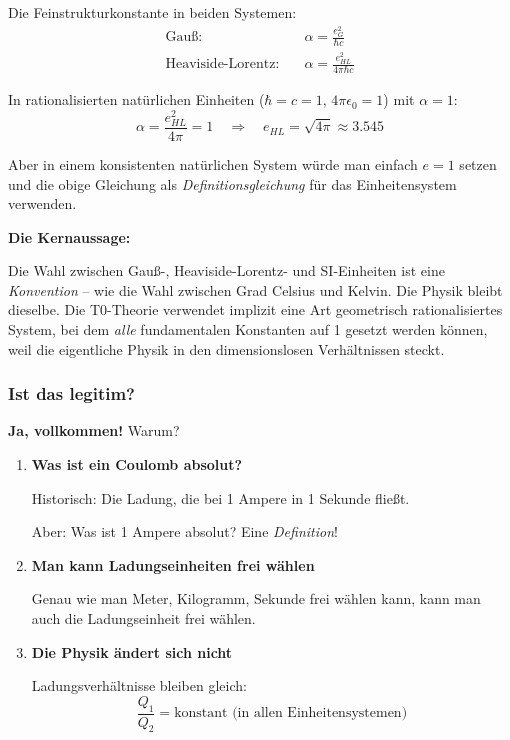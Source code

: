 Die Feinstrukturkonstante in beiden Systemen:
\begin{align}
	\text{Gauß:} \quad &\alpha = \frac{e_G^2}{\hbar c} \\
	\text{Heaviside-Lorentz:} \quad &\alpha = \frac{e_{HL}^2}{4\pi\hbar c}
\end{align}

In rationalisierten natürlichen Einheiten ($\hbar = c = 1$, $4\pi\epsilon_0 = 1$) mit $\alpha = 1$:
\begin{equation}
	\alpha = \frac{e_{HL}^2}{4\pi} = 1 \quad \Rightarrow \quad e_{HL} = \sqrt{4\pi} \approx 3.545
\end{equation}

Aber in einem konsistenten natürlichen System würde man einfach $e = 1$ setzen und die obige Gleichung als \textit{Definitionsgleichung} für das Einheitensystem verwenden.

\textbf{Die Kernaussage:}

Die Wahl zwischen Gauß-, Heaviside-Lorentz- und SI-Einheiten ist eine \textit{Konvention} -- wie die Wahl zwischen Grad Celsius und Kelvin. Die Physik bleibt dieselbe. Die T0-Theorie verwendet implizit eine Art geometrisch rationalisiertes System, bei dem \textit{alle} fundamentalen Konstanten auf 1 gesetzt werden können, weil die eigentliche Physik in den dimensionslosen Verhältnissen steckt.
\subsubsection{Ist das legitim?}

\textbf{Ja, vollkommen!} Warum?

\begin{enumerate}
	\item \textbf{Was ist ein Coulomb absolut?}
	
	Historisch: Die Ladung, die bei 1 Ampere in 1 Sekunde fließt.
	
	Aber: Was ist 1 Ampere absolut? Eine \textit{Definition}!
	
	\item \textbf{Man kann Ladungseinheiten frei wählen}
	
	Genau wie man Meter, Kilogramm, Sekunde frei wählen kann, kann man auch die Ladungseinheit frei wählen.
	
	\item \textbf{Die Physik ändert sich nicht}
	
	Ladungsverhältnisse bleiben gleich:
	\begin{equation}
		\frac{Q_1}{Q_2} = \text{konstant (in allen Einheitensystemen)}
	\end{equation}
\end{enumerate}

